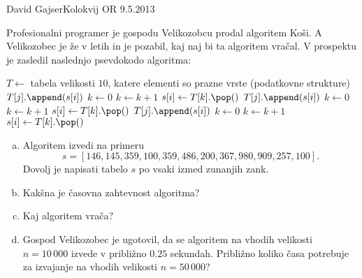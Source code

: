 \begin{naloga}{David Gajser}{Kolokvij OR 9.5.2013}
\begin{vprasanje}
Profesionalni programer je gospodu Velikozobcu prodal algoritem {\sc Koši}.
A Velikozobec je že v letih in je pozabil, kaj naj bi ta algoritem vračal.
V prospektu je zasledil naslednjo psevdokodo algoritma:
\begin{small}
\begin{algorithmic}
\State $T \gets$ tabela velikosti $10$,
    katere elementi so prazne vrste (podatkovne strukture)
            \State $T[j].\append(s[i])$
        \EndIf
    \EndFor
\EndFor
\State $k \gets 0$
        \State $k \gets k+1$
    \EndWhile
    \State $s[i] \gets T[k].\pop()$
\EndFor
{}
            \State $T[j].\append(s[i])$
        \EndIf
    \EndFor
\EndFor
\State $k \gets 0$
        \State $k \gets k+1$
    \EndWhile
    \State $s[i] \gets T[k].\pop()$
\EndFor
{}
            \State $T[j].\append(s[i])$
        \EndIf
    \EndFor
\EndFor
\State $k \gets 0$
        \State $k \gets k+1$
    \EndWhile
    \State $s[i] \gets T[k].\pop()$
\EndFor
\State {}
\end{algorithmic}
\end{small}

\begin{enumerate}[(a)]
\item Algoritem izvedi na primeru
$$
s = [146, 145, 359, 100, 359, 486, 200, 367, 980, 909, 257, 100] .
$$
Dovolj je napisati tabelo $s$ po vsaki izmed zunanjih zank.

\item Kakšna je časovna zahtevnost algoritma?

\item Kaj algoritem vrača?

\item Gospod Velikozobec je ugotovil,
da se algoritem na vhodih velikosti $n = 10\,000$
izvede v približno $0.25$ sekundah.
Približno koliko časa potrebuje za izvajanje
na vhodih velikosti $n = 50\,000$?
\end{enumerate}
\end{vprasanje}


\end{naloga}

